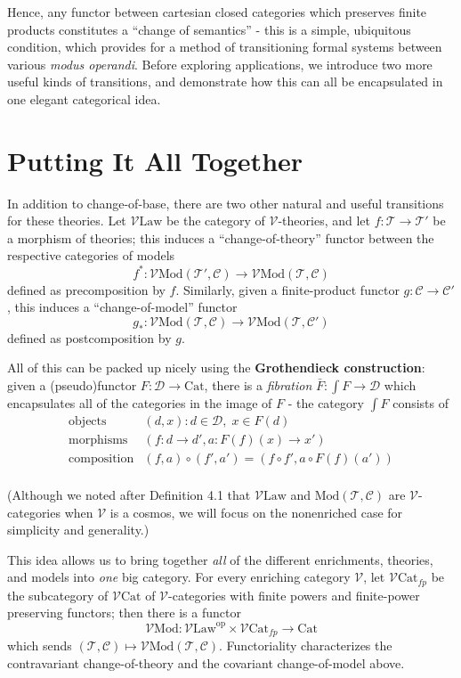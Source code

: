 \documentclass[a4paper,UKenglish]{article}
\theoremstyle{definition}
\newcommand{\Cat}{\mathrm{Cat}}
\newcommand{\Law}{\mathrm{Law}}
\newcommand{\Mod}{\mathrm{Mod}}
\newcommand{\op}{\mathrm{op}}
\newcommand{\V}{\mathscr{V}}
\newcommand{\D}{\mathscr{D}}
\newcommand{\C}{\mathscr{C}}
\newcommand{\T}{\mathscr{T}}
\begin{document}
Hence, any functor between cartesian closed categories which preserves finite products constitutes a ``change of semantics'' - this is a simple, ubiquitous condition, which provides for a method of transitioning formal systems between various \textit{modus operandi}. Before exploring applications, we introduce two more useful kinds of transitions, and demonstrate how this can all be encapsulated in one elegant categorical idea.

\section{Putting It All Together}

In addition to change-of-base, there are two other natural and useful transitions for these theories. Let $\V\mathrm{Law}$ be the category of $\V$-theories, and let $f:\T\to \T'$ be a morphism of theories; this induces a ``change-of-theory'' functor between the respective categories of models $$f^*:\V\Mod(\T',\C)\to \V\Mod(\T,\C)$$ defined as precomposition by $f$. Similarly, given a finite-product functor $g: \C \to \C'$, this induces a ``change-of-model'' functor $$g_*:\V\Mod(\T,\C) \to \V\Mod(\T,\C')$$ defined as postcomposition by $g$.

All of this can be packed up nicely using the \textbf{Grothendieck construction}: given a (pseudo)functor $F: \D \to \Cat$, there is a \textit{fibration} $\bar{F}: \int F \to \D$ which encapsulates all of the categories in the image of $F$ - the category $\int F$ consists of
\[\begin{array}{rl}
\text{objects} & (d,x) : d\in \D, \; x\in F(d)\\
\text{morphisms} & (f:d\to d',a:F(f)(x)\to x')\\
\text{composition} & (f,a) \circ (f',a') = (f \circ f', a \circ F(f)(a'))\\
\end{array}\]

(Although we noted after Definition 4.1 that $\V\Law$ and $\Mod(\T,\C)$ are $\V$-categories when $\V$ is a cosmos, we will focus on the nonenriched case for simplicity and generality.)

This idea allows us to bring together \textit{all} of the different enrichments, theories, and models into \textit{one} big category. For every enriching category $\V$, let $\V\Cat_{fp}$ be the subcategory of $\V\Cat$ of $\V$-categories with finite powers and finite-power preserving functors; then there is a functor $$\V\Mod: \V\Law^\op \times \V\Cat_{fp} \to \Cat$$ which sends $(\T,\C) \mapsto \V\Mod(\T,\C)$. Functoriality characterizes the contravariant change-of-theory and the covariant change-of-model above.
\end{document}
